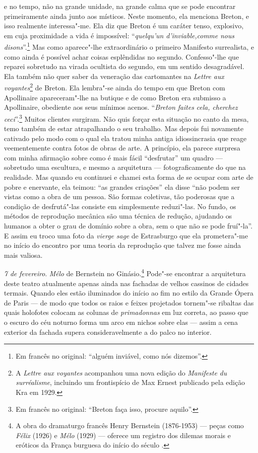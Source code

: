 e no tempo, não na grande unidade, na grande calma que se pode encontrar
primeiramente ainda junto aos místicos. Neste momento, ela menciona
Breton, e isso realmente interessa"-me. Ela diz que Breton é um caráter
tenso, explosivo, em cuja proximidade a vida é impossível:
``\emph{quelqu'un d'inviable,comme nous disons}''.\footnote{Em francês no original: ``alguém inviável, como nós dizemos''. \versal{[N. T.]}} Mas como
aparece"-lhe extraordinário o primeiro Manifesto surrealista, e como
ainda é possível achar coisas esplêndidas no segundo. Confesso"-lhe que
reparei sobretudo na virada ocultista do segundo, em um sentido
desagradável. Ela também não quer saber da veneração das cartomantes na
\emph{Lettre aux voyantes}\footnote{A \emph{Lettre aux voyantes}
  acompanhou uma nova edição do \emph{Manifeste du surréalisme},
  incluindo um frontispício de Max Ernest publicado pela edição Kra em
  1929. \versal{[N. E.]}} de Breton. Ela lembra"-se ainda do tempo em que Breton com
Apollinaire apareceram"-lhe na butique e de como Breton era submisso a
Apollinaire, obediente aos seus mínimos acenos. ``\emph{Breton faites
cela, cherchez ceci}''.\footnote{Em francês no original: ``Breton faça isso, procure
  aquilo''. \versal{[N. T.]}} Muitos clientes surgiram. Não quis
forçar esta situação no canto da mesa, temo também de estar atrapalhando
o seu trabalho. Mas depois fui novamente cativado pelo modo com o qual
ela tratou minha antiga idiossincrasia que reage veementemente contra
fotos de obras de arte. A princípio, ela parece surpresa com minha
afirmação sobre como é mais fácil ``desfrutar'' um quadro --- sobretudo uma
escultura, e mesmo a arquitetura --- fotograficamente do que na
realidade. Mas quando eu continuei e chamei esta forma de se ocupar com
arte de pobre e enervante, ela teimou: ``as grandes criações'' ela disse
``não podem ser vistas como a obra de um pessoa. São formas coletivas,
tão poderosas que a condição de desfrutá"-las consiste em simplesmente
reduzi"-las. No fundo, os métodos de reprodução mecânica são uma técnica
de redução, ajudando os humanos a obter o grau de domínio sobre a obra,
sem o que não se pode fruí"-la''. E assim eu troco uma foto da
\emph{vierge sage} de Estrasburgo que ela prometera"-me no início do
encontro por uma teoria da reprodução que talvez me fosse ainda mais
valiosa.

\emph{7 de fevereiro}. \emph{Mélo} de Bernstein no Ginásio.\footnote{A obra do dramaturgo francês Henry Bernstein (1876-1953) --- peças como
  \emph{Félix} (1926) e \emph{Mélo} (1929) --- oferece um registro dos
  dilemas morais e eróticos da França burguesa do início do século . \versal{[N. E.]}}
Pode"-se encontrar a arquitetura deste teatro atualmente apenas ainda nas
fachadas de velhos cassinos de cidades termais. Quando eles estão
iluminados do início ao fim no estilo da Grande Ópera de Paris --- de
modo que todos os raios e feixes projetados tornem"-se ribaltas das quais
holofotes colocam as colunas de \emph{primadonnas} em luz correta, ao
passo que o escuro do céu noturno forma um arco em nichos sobre elas ---
assim a cena exterior da fachada supera consideravelmente a do palco no
interior.

